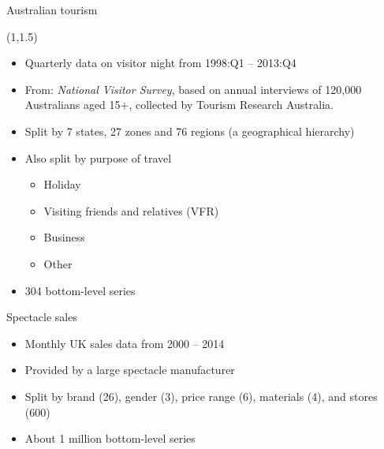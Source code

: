 \documentclass[14pt,ignorenonframetext,]{beamer}
\providecommand{\tightlist}{%
  \setlength{\itemsep}{0pt}\setlength{\parskip}{0pt}}
\begin{document}
\begin{frame}{Australian tourism}
\protect\hypertarget{australian-tourism-1}{}

\begin{textblock}{10}(1,1.5)\small
\begin{block}{}
  \begin{itemize}\itemsep=0cm\parskip=0cm
    \item Quarterly data on visitor night from 1998:Q1 -- 2013:Q4
    \item From: \textit{National Visitor Survey}, based on annual interviews of 120,000 Australians aged 15+, collected by Tourism Research Australia.
    \item Split by 7 states, 27 zones and 76 regions (a geographical hierarchy)
    \item Also split by purpose of travel
      \begin{itemize}
        \item Holiday
        \item Visiting friends and relatives (VFR)
        \item Business
        \item Other
      \end{itemize}
    \item 304 bottom-level series
  \end{itemize}
\end{block}
\end{textblock}

\end{frame}

\begin{frame}{Spectacle sales}
\protect\hypertarget{spectacle-sales}{}

\vspace*{4.8cm}

\begin{itemize}
\tightlist
\item
  Monthly UK sales data from 2000 -- 2014
\item
  Provided by a large spectacle manufacturer
\item
  Split by brand (26), gender (3), price range (6), materials (4), and
  stores (600)
\item
  About 1 million bottom-level series
\end{itemize}

\end{frame}
\end{document}
